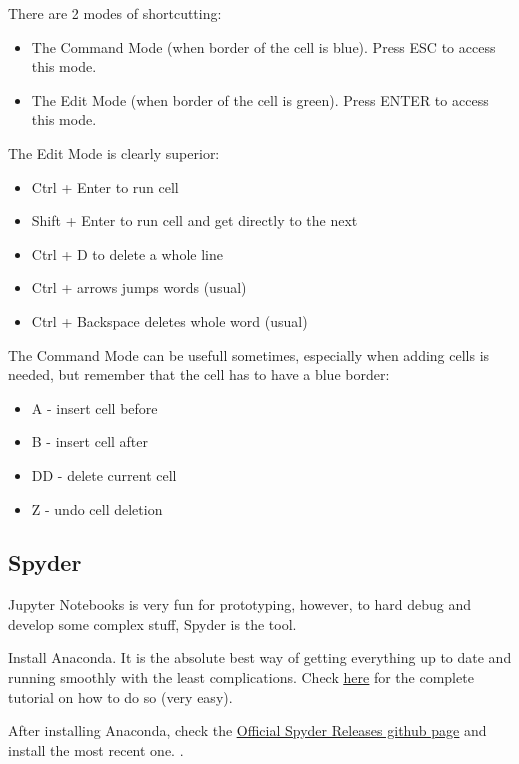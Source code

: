 \begin{center}
    There are 2 modes of shortcutting: 
\begin{itemize}
    \item The Command Mode (when border of the cell is blue). Press ESC to 
    access this mode.
    \item The Edit Mode (when border of the cell is green). Press ENTER to access this mode.
\end{itemize}

The Edit Mode is clearly superior: 
\begin{itemize}
    \item Ctrl + Enter to run cell
    \item Shift + Enter to run cell and get directly to the next
    \item Ctrl + D to delete a whole line
    \item Ctrl + arrows jumps words (usual)
    \item Ctrl + Backspace deletes whole word (usual)
\end{itemize} 

The Command Mode can be usefull sometimes, especially when adding cells is needed, but remember that the cell has to have a blue border:
\begin{itemize}
    \item A - insert cell before
    \item B - insert cell after
    \item DD - delete current cell
    \item Z - undo cell deletion
\end{itemize}


\end{center}



\subsection{Spyder}
Jupyter Notebooks is very fun for prototyping, however, to hard debug and develop some complex stuff, Spyder is the tool.

Install Anaconda. It is the absolute best way of getting everything up to date and running smoothly with the least complications. Check \href{https://linuxize.com/post/how-to-install-anaconda-on-ubuntu-18-04/}{\ul{here}} for the complete tutorial on how to do so (very easy).

After installing Anaconda, check the \href{https://github.com/spyder-ide/spyder/releases}{\ul{Official Spyder Releases github page}} and install the most recent one. .





